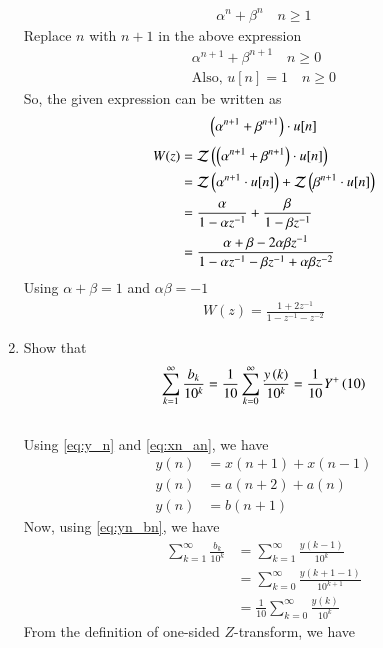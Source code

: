 \documentclass[journal,12pt,twocolumn]{IEEEtran}
\renewcommand\thesection{\arabic{section}}
\begin{document}
\begin{enumerate}[label=\thesection.\arabic*,ref=\thesection.\theenumi]
\solution
\begin{align}
	{\alpha}^n + {\beta}^n \quad n \ge 1
\end{align}
Replace $n$ with $n+1$ in the above expression
\begin{align}
	{\alpha}^{n+1} + {\beta}^{n+1} \quad n \ge 0 \\
	\text{Also, } u[n] = 1 \quad n \ge 0 
\end{align}
So, the given expression can be written as
\begin{align}
	\left({\alpha}^{n+1} + {\beta}^{n+1}\right) \cdot u[n] 
\end{align}
\begin{align}
	W(z) &= \mathcal{Z}\left(\left({\alpha}^{n+1} + {\beta}^{n+1}\right) \cdot u[n]\right) \\
	&= \mathcal{Z}\left({\alpha}^{n+1} \cdot u[n]\right) + \mathcal{Z}\left({\beta}^{n+1} \cdot u[n]\right) \\
	&= \frac{\alpha}{1 - \alpha z^{-1}} + \frac{\beta}{1 - \beta z^{-1}} \\
	&= \frac{\alpha + \beta - 2\alpha \beta z^{-1}}{1 - \alpha z^{-1} - \beta z^{-1} + \alpha \beta z^{-2}} 
\end{align}
Using $\alpha + \beta = 1$ and $\alpha \beta = -1$
\begin{align}
	W(z) = \frac{1 + 2z^{-1}}{1 - z^{-1} - z^{-2}}
\end{align}
\item Show that 
\begin{align}
	\sum_{k=1}^{\infty}\frac{b_k}{10^k} =
	\frac{1}{10}\sum_{k=0}^{\infty}\frac{y\left(k\right)}{10^k} =\frac{1}{10}Y^{+}\left({10}\right)
\end{align}
\solution
\\Using \eqref{eq:y_n} and \eqref{eq:xn_an}, we have
\begin{align}
	y(n) &= x(n+1) + x(n-1) \\
	y(n) &= a(n+2) + a(n) \\
	y(n) &= b(n+1)
	\label{eq:yn_bn}
\end{align}
Now, using \eqref{eq:yn_bn}, we have
\begin{align}
	\sum_{k=1}^{\infty}\frac{b_k}{10^k} &= \sum_{k=1}^{\infty}\frac{y(k-1)}{10^k} \\
	&= \sum_{k=0}^{\infty}\frac{y(k + 1 - 1)}{10^{k+1}} \\
	&= \frac{1}{10}\sum_{k=0}^{\infty}\frac{y(k)}{10^k}
\end{align}
From the definition of one-sided $Z$-transform, we have
\begin{align}

\end{align}
\end{enumerate}
\end{document}
